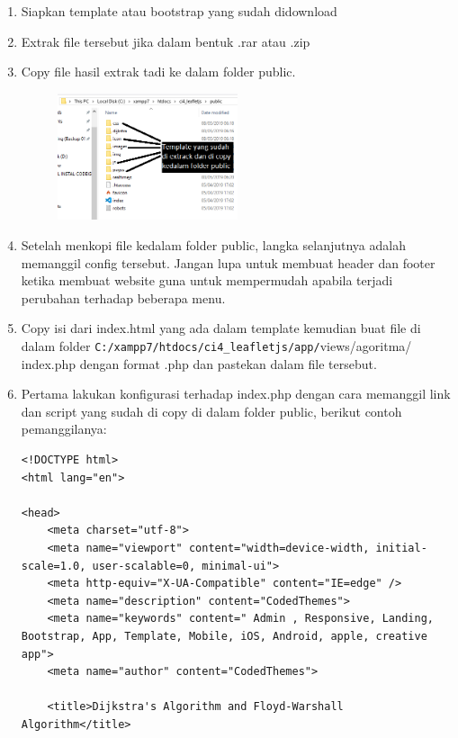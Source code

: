 \begin{enumerate}
    \item Siapkan template atau bootstrap yang sudah didownload
    \item Extrak file tersebut jika dalam bentuk .rar atau .zip
    \item Copy file hasil extrak tadi ke dalam folder public.
		\begin{figure}[!htbp]
    		\centering
    		\includegraphics[width=0.5\textwidth]{figures/CODEIGNITER4/CI10.PNG}
    		\label{CodeIgniter11}
		\end{figure}
		
	\item Setelah menkopi file kedalam folder public, langka selanjutnya adalah memanggil config tersebut. Jangan lupa untuk membuat header dan footer ketika membuat website guna untuk mempermudah apabila terjadi perubahan terhadap beberapa menu.
	\item Copy isi dari index.html yang ada dalam template kemudian buat file di dalam folder \verb|C:/xampp7/htdocs/ci4_leafletjs/app/|views/agoritma/ index.php dengan format .php dan pastekan dalam file tersebut.
	\item Pertama lakukan konfigurasi terhadap index.php dengan cara memanggil link dan script yang sudah di copy di dalam folder public, berikut contoh pemanggilanya:
\begin{lstlisting}[caption=Konfigurasi Template di CodeIgniter 4]
<!DOCTYPE html>
<html lang="en">

<head>
    <meta charset="utf-8">
    <meta name="viewport" content="width=device-width, initial-scale=1.0, user-scalable=0, minimal-ui">
    <meta http-equiv="X-UA-Compatible" content="IE=edge" />
    <meta name="description" content="CodedThemes">
    <meta name="keywords" content=" Admin , Responsive, Landing, Bootstrap, App, Template, Mobile, iOS, Android, apple, creative app">
    <meta name="author" content="CodedThemes">

    <title>Dijkstra's Algorithm and Floyd-Warshall Algorithm</title>
  

\end{lstlisting}
\end{enumerate}
